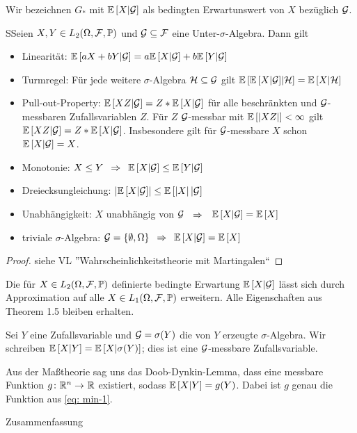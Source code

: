 
Wir bezeichnen $G_\ast$ mit $\EW[X|\G]$ als bedingten Erwartunswert von $X$ bezüglich $\G$.

\begin{theorem} %
	SSeien $X,Y \in L_2(\Omega,\F,\P)$ und $\G \subseteq \F$ eine Unter-$\sigma$-Algebra. Dann gilt
	\begin{itemize}
		\item Linearität: $\EW[aX + bY | \G] = a \EW[X|\G] + b\EW[Y|\G]$
		\item Turmregel: Für jede weitere $\sigma$-Algebra $\mathcal{H} \subseteq \G$ gilt ${\EW[{\EW[{X|\G}]}|\mathcal{H}]} = {\EW[X|\mathcal{H}]}$
		\item Pull-out-Property: $\EW[XZ|\G] = Z * \EW[X | \G]$ für alle beschränkten und $\G$-messbaren Zufallsvariablen $Z$.
		Für $Z$ $\G$-messbar mit $\EW[\abs{XZ}] < \infty$ gilt $\EW[XZ | \G] = Z * \EW[X | \G]$. Insbesondere gilt für $\G$-messbare $X$ schon $\EW[X|\G]=X$.
		\item Monotonie: $X \le Y \follows \EW[X|\G] \le \EW[Y|\G]$
		\item Dreiecksungleichung: $\abs{\EW[X|\G]} \le \EW[\abs{X}|\G]$
		\item Unabhängigkeit: $X$ unabhängig von $\G$ $\follows$ $\EW[X|\G] = \EW[X]$
		\item triviale $\sigma$-Algebra: $\G=\menge{\emptyset, \Omega} \follows \EW[X|\G] = \EW[X]$
	\end{itemize}
\end{theorem}
\begin{proof}
	siehe VL ''Wahrscheinlichkeitstheorie mit Martingalen``
\end{proof}

Die für $X \in L_2(\Omega,\F,\P)$ definierte bedingte Erwartung $\EW[X|\G]$ lässt sich durch Approximation auf alle $X \in L_1(\Omega,\F,\P)$ erweitern. Alle Eigenschaften aus Theorem 1.5 bleiben erhalten. %

Sei $Y$ eine Zufallsvariable und $\G= \sigma(Y)$ die von $Y$ erzeugte $\sigma$-Algebra. Wir schreiben $\EW[X|Y] = \EW[X|\sigma(Y)]$; dies ist eine $\G$-messbare Zufallsvariable.

Aus der Maßtheorie sag uns das Doob-Dynkin-Lemma, dass eine messbare Funktion $\abb{g}{\Rn}{\R}$ existiert, sodass $\EW[X|Y] = g(Y)$. Dabei ist $g$ genau die Funktion aus \eqref{eq: min-1}.

Zusammenfassung

